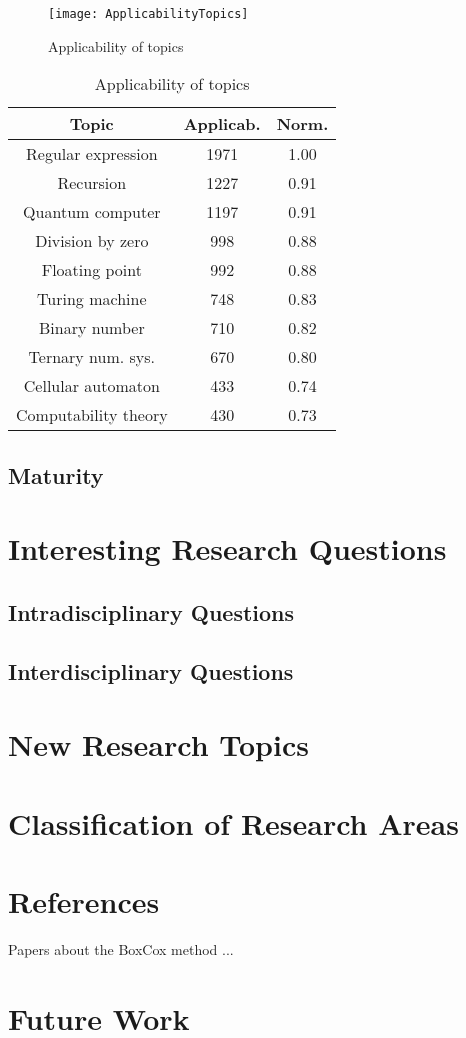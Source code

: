 \begin{figure}[h]
\centering\texttt{[image: ApplicabilityTopics]}
\caption{\label{fig:Applicability-of-Topics}Applicability of topics}
\end{figure}

\begin{table}
\begin{centering}
\begin{tabular}{|c|c|c|}
\hline 
Topic & Applicab. & Norm.\tabularnewline
\hline 
\hline 
Regular expression & 1971 & 1.00\tabularnewline
\hline 
Recursion & 1227 & 0.91\tabularnewline
\hline 
Quantum computer & 1197 & 0.91\tabularnewline
\hline 
Division by zero & 998 & 0.88\tabularnewline
\hline 
Floating point & 992 & 0.88\tabularnewline
\hline 
Turing machine & 748 & 0.83\tabularnewline
\hline 
Binary number & 710 & 0.82\tabularnewline
\hline 
Ternary num. sys. & 670 & 0.80\tabularnewline
\hline 
Cellular automaton & 433 & 0.74\tabularnewline
\hline 
Computability theory & 430 & 0.73\tabularnewline
\hline 
\end{tabular}
\par\end{centering}

\caption{\label{tab:Applicability-of-Topics}Applicability of topics}
\end{table}

\subsection{Maturity}

\section{Interesting Research Questions}

\subsection{Intradisciplinary Questions}

\subsection{Interdisciplinary Questions}

\section{New Research Topics}

\section{Classification of Research Areas}

\section{References}

Papers about the BoxCox method ...

\section{Future Work}


